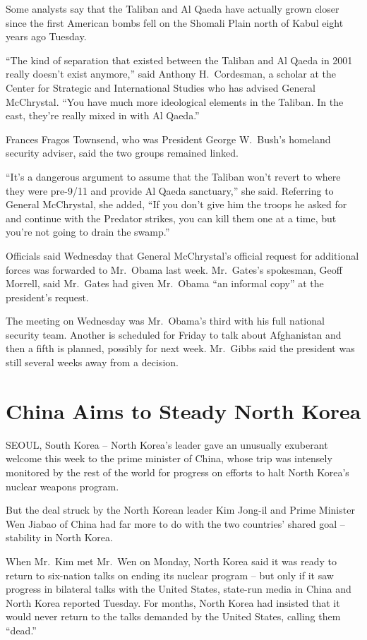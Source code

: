 ﻿\documentclass[12pt]{article}
\begin{document}
Some analysts say that the Taliban and Al Qaeda have actually grown closer since the first American
bombs fell on the Shomali Plain north of Kabul eight years ago Tuesday.

``The kind of separation that existed between the Taliban and Al Qaeda in 2001 really doesn't exist
anymore,'' said Anthony H.~Cordesman, a scholar at the Center for Strategic and International
Studies who has advised General McChrystal. ``You have much more ideological elements in the
Taliban. In the east, they're really mixed in with Al Qaeda.''

Frances Fragos Townsend, who was President George W.~Bush's homeland security adviser, said the two
groups remained linked.

``It's a dangerous argument to assume that the Taliban won't revert to where they were pre-9/11 and
provide Al Qaeda sanctuary\cite{sanctuary},'' she said. Referring to General McChrystal, she added,
``If you don't give him the troops he asked for and continue with the Predator strikes, you can kill
them one at a time, but you're not going to drain the swamp\cite{swamp}.''

Officials said Wednesday that General McChrystal's official request for additional forces was
forwarded to Mr.~Obama last week. Mr.~Gates's spokesman, Geoff Morrell, said Mr.~Gates had given
Mr.~Obama ``an informal copy'' at the president's request.

The meeting on Wednesday was Mr.~Obama's third with his full national security team. Another is
scheduled for Friday to talk about Afghanistan and then a fifth is planned, possibly for next week.
Mr.~Gibbs said the president was still several weeks away from a decision.

\section{China Aims to Steady North Korea}

\lettrine{S}{EOUL}, South Korea -- North Korea's leader gave an unusually
exuberant welcome this week to the prime minister of China, whose trip was intensely monitored by
the rest of the world for progress on efforts to halt North Korea's nuclear weapons program.

But the deal struck by the North Korean leader Kim Jong-il and Prime Minister Wen Jiabao of China
had far more to do with the two countries' shared goal -- stability in North Korea.

When Mr.~Kim met Mr.~Wen on Monday, North Korea said it was ready to return to six-nation talks on
ending its nuclear program -- but only if it saw progress in bilateral talks with the United States,
state-run media in China and North Korea reported Tuesday. For months, North Korea had insisted that
it would never return to the talks demanded by the United States, calling them ``dead.''
\end{document}
